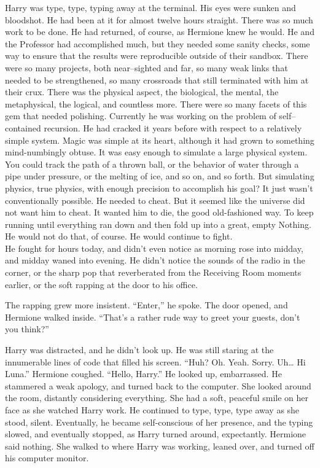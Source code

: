 Harry was type, type, typing away at the terminal. His eyes were sunken and bloodshot. He had been at it for almost twelve hours straight. There was so much work to be done. He had returned, of course, as Hermione knew he would. He and the Professor had accomplished much, but they needed some sanity checks, some way to ensure that the results were reproducible outside of their sandbox.
\SmallVSpace
There were so many projects, both near\mbox{--}sighted and far, so many weak links that needed to be strengthened, so many crossroads that still terminated with him at their crux. There was the physical aspect, the biological, the mental, the metaphysical, the logical, and countless more. There were so many facets of this gem that needed polishing.
\SmallVSpace
Currently he was working on the problem of self\mbox{--}contained recursion. He had cracked it years before with respect to a relatively simple system. Magic was simple at its heart, although it had grown to something mind-numbingly obtuse. It was easy enough to simulate a large physical system. You could track the path of a thrown ball, or the behavior of water through a pipe under pressure, or the melting of ice, and so on, and so forth. But simulating physics, true physics, with enough precision to accomplish his goal? It just wasn’t conventionally possible. He needed to cheat.
\SmallVSpace
But it seemed like the universe did not want him to cheat. It wanted him to die, the good old-fashioned way. To keep running until everything ran down and then fold up into a great, empty Nothing.
\SmallVSpace
He would not do that, of course. He would continue to fight.\\
He fought for hours today, and didn’t even notice as morning rose into midday, and midday waned into evening. He didn’t notice the sounds of the radio in the corner, or the sharp pop that reverberated from the Receiving Room moments earlier, or the soft rapping at the door to his office.


The rapping grew more insistent. “Enter,” he spoke.
\SmallVSpace
The door opened, and Hermione walked inside. “That’s a rather rude way to greet your guests, don’t you think?”

Harry was distracted, and he didn’t look up. He was still staring at the innumerable lines of code that filled his screen. “Huh? Oh. Yeah. Sorry. Uh… Hi Luna.”
\SmallVSpace
Hermione coughed. “Hello, Harry.”
\SmallVSpace
He looked up, embarrassed. He stammered a weak apology, and turned back to the computer. She looked around the room, distantly considering everything. She had a soft, peaceful smile on her face as she watched Harry work. He continued to type, type, type away as she stood, silent. Eventually, he became self-conscious of her presence, and the typing slowed, and eventually stopped, as Harry turned around, expectantly.
\SmallVSpace
Hermione said nothing. She walked to where Harry was working, leaned over, and turned off his computer monitor.

